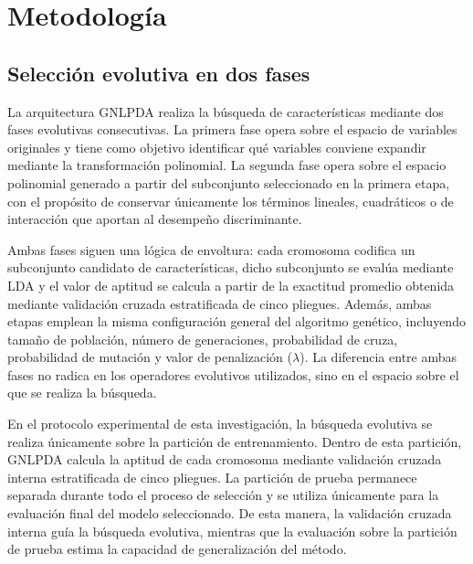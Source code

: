 
\chapter{Metodología}
\label{chap:Metodología}

\section{Selección evolutiva en dos fases}


La arquitectura GNLPDA realiza la búsqueda de características mediante dos fases evolutivas consecutivas. La primera fase opera sobre el espacio de variables originales y tiene como objetivo identificar qué variables conviene expandir mediante la transformación polinomial. La segunda fase opera sobre el espacio polinomial generado a partir del subconjunto seleccionado en la
primera etapa, con el propósito de conservar únicamente los términos lineales, cuadráticos o
de interacción que aportan al desempeño discriminante.

Ambas fases siguen una lógica de envoltura: cada cromosoma codifica un subconjunto candidato de características, dicho subconjunto se evalúa mediante LDA y el valor de aptitud se calcula a partir de la exactitud promedio obtenida mediante validación cruzada estratificada de cinco pliegues. Además, ambas etapas emplean la misma configuración general del algoritmo genético, incluyendo tamaño de población, número de generaciones, probabilidad de cruza, probabilidad de mutación y valor de penalización ($\lambda$). La diferencia entre ambas fases no radica en los operadores evolutivos utilizados, sino en el espacio sobre el que se realiza la búsqueda.

En el protocolo experimental de esta investigación, la búsqueda evolutiva se realiza
únicamente sobre la partición de entrenamiento. Dentro de esta partición, GNLPDA calcula
la aptitud de cada cromosoma mediante validación cruzada interna estratificada de cinco pliegues. La partición de prueba permanece separada durante todo el proceso de selección y se utiliza únicamente para la evaluación final del modelo seleccionado. De esta manera, la
validación cruzada interna guía la búsqueda evolutiva, mientras que la evaluación sobre la partición de prueba estima la capacidad de generalización del método.

